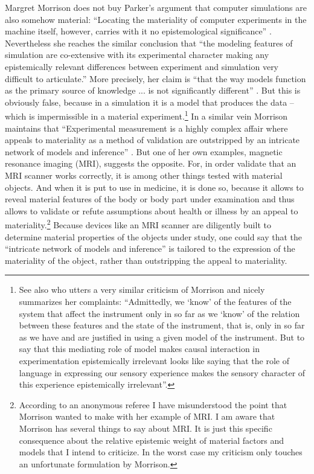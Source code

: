 \documentclass[12pt, a4paper]{article}
\numberwithin{equation}{section}
\begin{document}
Margret Morrison does not buy Parker's argument that computer simulations are also somehow material: ``Locating the materiality of computer experiments in the machine itself, however, carries with it no epistemological significance'' \cite[p.\ 48]{morrison:2009}. Nevertheless she reaches the similar conclusion that ``the modeling features of simulation are co-extensive with its experimental character making any epistemically relevant differences between experiment and simulation very difficult to articulate.'' More precisely, her claim is ``that the way models function as the primary source of knowledge ... is not significantly different'' \cite[p.\ 43]{morrison:2009}. But this is obviously false, because in a simulation it is a model that produces the data --  which is impermissible in a material experiment.\footnote{See also \cite[p.\ 15]{peschard:2011} who utters a very similar criticism of Morrison and nicely summarizes her complaints: ``Admittedly, we ‘know’ of the features of the system that affect the instrument only in so far as we ‘know’ of the relation between these features and the state of the instrument, that is, only in so far as we have and are justified in using a given model of the instrument. But to say that this mediating role of model makes causal interaction in experimentation epistemically irrelevant looks like saying that the role of language in expressing our sensory experience makes the sensory character of this experience epistemically irrelevant''.} In a similar vein Morrison maintains that ``Experimental measurement is a highly complex affair where appeals to materiality as a method of validation are outstripped by an intricate network of models and inference'' \cite[p.\ 53]{morrison:2009}. But one of her own examples, magnetic resonance imaging (MRI), suggests the opposite. For, in order validate that an MRI scanner works correctly, it is among other things tested with material objects. And when it is put to use in medicine, it is done so, because it allows to reveal material features of the body or body part under examination and thus allows to validate or refute assumptions about health or illness by an appeal to materiality.\footnote{According to an anonymous referee I have misunderstood the point that Morrison wanted to make with her example of MRI. I am aware that Morrison has several things to say about MRI. It is just this specific consequence about the relative epistemic weight of material factors and models that I intend to criticize. In the worst case my criticism only touches an unfortunate formulation by Morrison.} Because devices like an MRI scanner are diligently built to determine material properties of the objects under study, one could say that the ``intricate network of models and inference'' is tailored to the expression of the materiality of the object, rather than outstripping the appeal to materiality.
\end{document}
